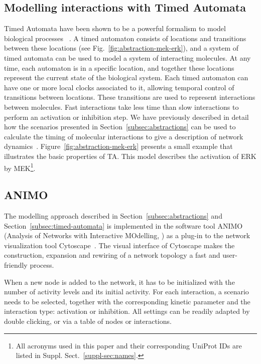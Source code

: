 \documentclass{bmcart}
\def\ta{Timed Automaton}
\def\tas{Timed Automata}
\begin{document}
\subsection*{Modelling interactions with Timed Automata}\label{subsec:timed-automata}
\def\ta{TA}
\def\tas{TA}

Timed Automata have been shown to be a powerful formalism to model biological processes
~\cite{ta-siebert,bartocci-oscillators,oded-ode-ta-discretization}. A timed automaton consists of locations
and transitions between these locations (see Fig.~\ref{fig:abstraction-mek-erk}), and a system of timed automata can be 
used to model a system of interacting molecules. At any time, each automaton is in a specific location, and together 
these locations represent the current state of the biological system. Each timed automaton can have one or more local clocks
associated to it, allowing temporal control of transitions between locations. These transitions are used to 
represent interactions between molecules. Fast interactions take less time than slow interactions 
to perform an activation or inhibition step. We have previously described in detail how the 
scenarios presented in Section~\ref{subsec:abstractions} can be used to calculate the timing of molecular 
interactions to give a description of network dynamics~\cite{animo-bibe}. Figure~\ref{fig:abstraction-mek-erk}
presents a small example that illustrates the basic properties of \tas. 
This model describes the activation of ERK by MEK\footnote{All acronyms used in this paper
and their corresponding UniProt IDs are listed in Suppl. Sect.~\ref{suppl-sec:names}.}.






\subsection*{ANIMO}
The modelling approach described in Section~\ref{subsec:abstractions} and Section~\ref{subsec:timed-automata}
is implemented in the
software tool ANIMO (Analysis of Networks with Interactive MOdelling, \cite{animo-bibe}) as
a plug-in to the network visualization tool Cytoscape~\cite{cytoscape}. The visual interface of Cytoscape
makes the construction, expansion and rewiring of a network topology a fast and user-friendly process. 

When a new node is added to the network, it has to be initialized with the number of activity levels and 
its initial activity. 
For each interaction, a scenario needs to be selected, together with the corresponding kinetic parameter and 
the interaction type: activation or inhibition. All settings can be readily adapted by double clicking, or via a 
table of nodes or interactions. 
\end{document}

